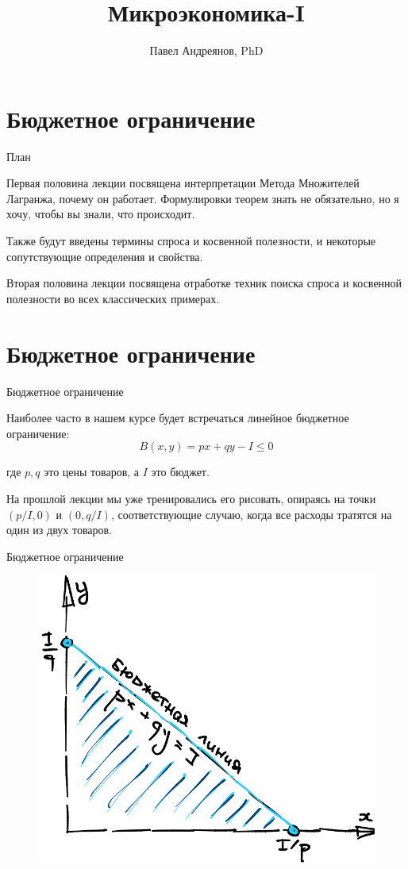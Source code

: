 \documentclass{beamer}
\title{
Микроэкономика-I
}
\author{
Павел Андреянов, PhD
}
\begin{document}
\maketitle

\section{Бюджетное ограничение}

\begin{frame}{План}

Первая половина лекции посвящена интерпретации Метода Множителей Лагранжа, почему он работает. Формулировки теорем знать не обязательно, но я хочу, чтобы вы знали, что происходит. 

Также будут введены термины спроса и косвенной полезности, и некоторые сопутствующие определения и свойства.

Вторая половина лекции посвящена отработке техник поиска спроса и косвенной полезности во всех классических примерах.

\end{frame}


\section{Бюджетное ограничение}

\begin{frame}{Бюджетное ограничение}

Наиболее часто в нашем курсе будет встречаться линейное бюджетное ограничение:
$$ B(x,y) = p x + q y - I \leqslant 0$$

где $p, q$ это цены товаров, а $I$ это бюджет. 

На прошлой лекции мы уже тренировались его рисовать, опираясь на точки $(p/I, 0)$ и $(0, q/I)$, соответствующие случаю, когда все расходы тратятся на один из двух товаров.

\end{frame}

\begin{frame}{Бюджетное ограничение}

\begin{figure}[hbt]
\centering
\includegraphics[width=.8 \textwidth]{budget_2d.png}
\end{figure}

\end{frame}
\end{document}
